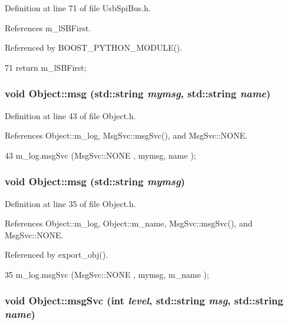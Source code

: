 Definition at line 71 of file UsbSpiBus.h.

References m\_\-lSBFirst.

Referenced by BOOST\_\-PYTHON\_\-MODULE().


\begin{DoxyCode}
71 { return m_lSBFirst; }
\end{DoxyCode}
\hypertarget{classObject_ac5d59299273cee27aacf7de00d2e7034}{
\subsubsection[{msg}]{\setlength{\rightskip}{0pt plus 5cm}void Object::msg (std::string {\em mymsg}, \/  std::string {\em name})}}
\label{classObject_ac5d59299273cee27aacf7de00d2e7034}


Definition at line 43 of file Object.h.

References Object::m\_\-log, MsgSvc::msgSvc(), and MsgSvc::NONE.


\begin{DoxyCode}
43 { m_log.msgSvc (MsgSvc::NONE    , mymsg, name ); }
\end{DoxyCode}
\hypertarget{classObject_a58b2d0618c2d08cf2383012611528d97}{
\subsubsection[{msg}]{\setlength{\rightskip}{0pt plus 5cm}void Object::msg (std::string {\em mymsg})}}
\label{classObject_a58b2d0618c2d08cf2383012611528d97}


Definition at line 35 of file Object.h.

References Object::m\_\-log, Object::m\_\-name, MsgSvc::msgSvc(), and MsgSvc::NONE.

Referenced by export\_\-obj().


\begin{DoxyCode}
35 { m_log.msgSvc (MsgSvc::NONE    , mymsg, m_name ); }
\end{DoxyCode}
\hypertarget{classObject_a3f9d5537ebce0c0f2bf6ae4d92426f3c}{
\subsubsection[{msgSvc}]{\setlength{\rightskip}{0pt plus 5cm}void Object::msgSvc (int {\em level}, \/  std::string {\em msg}, \/  std::string {\em name})}}
\label{classObject_a3f9d5537ebce0c0f2bf6ae4d92426f3c}


